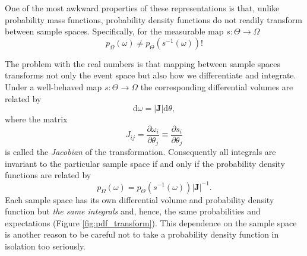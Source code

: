 \documentclass[11pt, oneside]{article}
\newcommand{\dd}{ \mathrm{d} }
\begin{document}
One of the most awkward properties of these representations is that, 
unlike probability mass functions, probability density functions do not
readily transform between sample spaces.  Specifically, for the
measurable map $s : \Theta \rightarrow \Omega$
%
\begin{equation*}
p_{\Omega} \! \left( \omega \right)
\neq
p_{\Theta} \! \left( s^{-1} \! \left( \omega \right) \right)!
\end{equation*}

The problem with the real numbers is that mapping between sample
spaces transforms not only the event space but also how we differentiate
and integrate.  Under a well-behaved map $s : \Theta \rightarrow \Omega$ 
the corresponding differential volumes are related by
%
\begin{equation*}
\dd \omega = \left| \mathbf{J} \right| \dd \theta,
\end{equation*}
%
where the matrix
%
\begin{equation*}
J_{ij} 
= 
\frac{\partial \omega_{i} }{ \partial \theta_{j} }
\equiv 
\frac{ \partial s_{i} }{ \partial \theta_{j} }
\end{equation*} 
%
is called the \emph{Jacobian} of the transformation.  Consequently
all integrals are invariant to the particular sample space if and only
if the probability density functions are related by
%
\begin{equation*}
p_{\Omega} \! \left( \omega \right) 
= 
p_{\Theta} \! \left( s^{-1} \! \left( \omega \right) \right) | \mathbf{J} |^{-1}.
\end{equation*}
%
Each sample space has its own differential volume and probability density 
function but \emph{the same integrals} and, hence, the same probabilities 
and expectations (Figure \ref{fig:pdf_transform}).  This dependence on the
sample space is another reason to be careful not to take a probability
density function in isolation too seriously.
\end{document}
